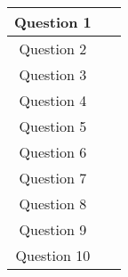 {{{\large
\begin{center}
\mbox{ }
\vspace{.25in} \\
\begin{tabular}{|c|l|}
\hline \hline
\hspace{.05in} Question 1 \hspace{.05in} & \hspace{.5in} \mbox{ }  \\ \hline
\hspace{.05in} Question 2 \hspace{.05in} & \hspace{.5in} \mbox{ } \\ \hline
\hspace{.05in} Question 3 \hspace{.05in} & \hspace{.5in} \mbox{ } \\ \hline
\hspace{.05in} Question 4 \hspace{.05in} & \hspace{.5in} \mbox{ } \\ \hline
\hspace{.05in} Question 5 \hspace{.05in} & \hspace{.5in} \mbox{ }  \\ \hline 
\hspace{.05in} Question 6 \hspace{.05in} & \hspace{.5in} \mbox{ }  \\ \hline
\hspace{.05in} Question 7 \hspace{.05in} & \hspace{.5in} \mbox{ }  \\ \hline
\hspace{.05in} Question 8 \hspace{.05in} & \hspace{.5in} \mbox{ } \\ \hline
\hspace{.05in} Question 9 \hspace{.05in} & \hspace{.5in} \mbox{ } \\ \hline
\hspace{.05in} Question 10\hspace{.05in} & \hspace{.5in} \mbox{ } \\ \hline


\end{tabular}
\end{center}}}}
